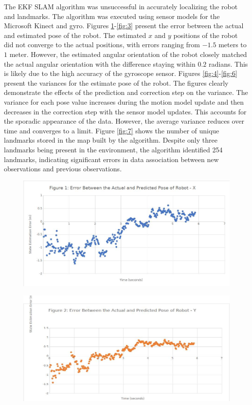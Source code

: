 \documentclass[journal]{IEEEtran}
\begin{document}
The EKF SLAM algorithm was unsuccessful in accurately localizing the robot and landmarks. The 
algorithm was executed using sensor models for the Microsoft Kinect and gyro. Figures \ref{fig:1}-\ref{fig:3}
present the error between the actual and estimated pose of the robot. The estimated $x$ and $y$ positions of the 
robot did not converge to the actual positions, with errors ranging from $-1.5$ meters to $1$ meter. However, 
the estimated angular orientation of the robot closely matched the actual angular orientation with the 
difference staying within $0.2$ radians. This is likely due to the high accuracy of the gyroscope sensor. 
Figures \ref{fig:4}-\ref{fig:6} present the variances for the estimate pose of the robot. The figures clearly demonstrate 
the effects of the prediction and correction step on the variance. The variance for each pose value 
increases during the motion model update and then decreases in the correction step with the sensor 
model updates. This accounts for the sporadic appearance of the data. However, the average variance 
reduces over time and converges to a limit. Figure \ref{fig:7} shows the number of unique landmarks stored in the 
map built by the algorithm. Despite only three landmarks being present in the environment, the algorithm 
identified 254 landmarks, indicating significant errors in data association between new observations and 
previous observations.

\begin{figure}[!t]%
\centering
\includegraphics[width=0.9\linewidth]{Figures/1-actual-predicted-error-x.jpg}
\caption{}
\label{fig:1}
\end{figure}

\begin{figure}[!t]%
\centering
\includegraphics[width=0.9\linewidth]{Figures/2-actual-predicted-error-y.jpg}
\caption{}
\label{fig:2}
\end{figure}
\end{document}

